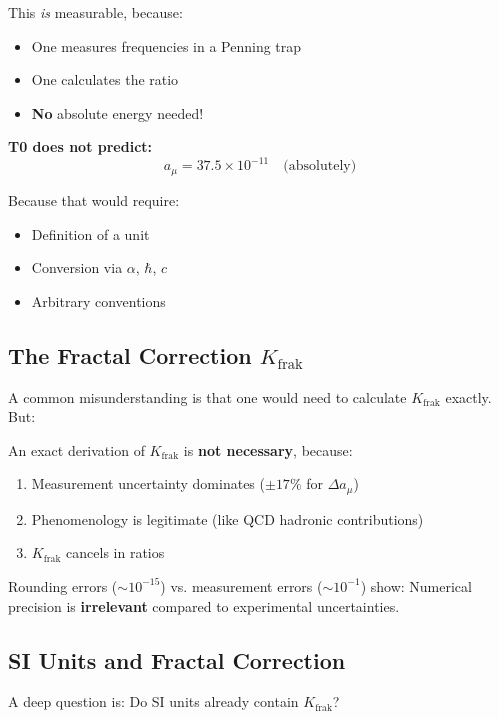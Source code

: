 This \textit{is} measurable, because:
\begin{itemize}[nosep]
	\item One measures frequencies in a Penning trap
	\item One calculates the ratio
	\item \textbf{No} absolute energy needed!
\end{itemize}

\textbf{T0 does not predict:}
\begin{equation}
	a_\mu = 37.5 \times 10^{-11} \quad \text{(absolutely)}
\end{equation}

Because that would require:
\begin{itemize}[nosep]
	\item Definition of a unit
	\item Conversion via $\alpha$, $\hbar$, $c$
	\item Arbitrary conventions
\end{itemize}

\subsection{The Fractal Correction $K_\text{frak}$}

A common misunderstanding is that one would need to calculate $K_\text{frak}$ exactly. But:

\begin{important}
	An exact derivation of $K_\text{frak}$ is \textbf{not necessary}, because:
	\begin{enumerate}
		\item Measurement uncertainty dominates ($\pm 17\%$ for $\Delta a_\mu$)
		\item Phenomenology is legitimate (like QCD hadronic contributions)
		\item $K_\text{frak}$ cancels in ratios
	\end{enumerate}
\end{important}

Rounding errors ($\sim 10^{-15}$) vs. measurement errors ($\sim 10^{-1}$) show: Numerical precision is \textbf{irrelevant} compared to experimental uncertainties.

\subsection{SI Units and Fractal Correction}

A deep question is: Do SI units already contain $K_\text{frak}$?

